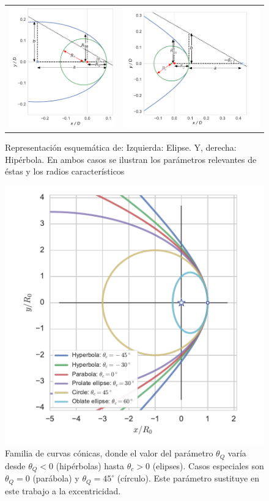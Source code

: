 \begin{figure}
  \begin{tabular}{cc}
    \includegraphics[width=0.4\linewidth]{./Figures/ellipse_edited} &
    \includegraphics[width=0.5\linewidth]{./Figures/hyperbola_edited}
  \end{tabular}
  \caption{Representación esquemática de: Izquierda: Elipse. Y, derecha: Hipérbola. En ambos casos se ilustran los parámetros relevantes de éstas y los radios característicos}
  \label{fig:conics}
\end{figure}

\begin{figure}
  \includegraphics[width = 0.5\linewidth]{./Figures/conic1}
  \caption{Familia de curvas cónicas, donde el valor del parámetro $\theta_Q$ varía desde $\theta_Q < 0$ (hipérbolas) hasta $\theta_c > 0$ (elipses). Casos especiales son $\theta_Q = 0$ (parábola) y $\theta_Q = 45^\circ$ (círculo). Este parámetro sustituye en este trabajo a la excentricidad.}
  \label{fig:conics-family}
\end{figure}

